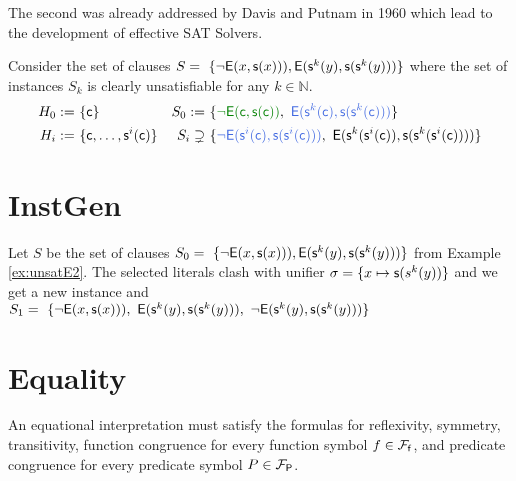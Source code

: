 The second was already addressed by Davis and Putnam in 1960
which lead to the development of effective SAT Solvers.

\begin{example}\label{ex:unsatE2}
	Consider the set of clauses 
	$S =\
	\{
	{ \lnot{\mathsf{E}}(x, {\mathsf s}(x)))}, 
	{ {\mathsf{E}}({\mathsf s}^k(y), {\mathsf s}({\mathsf s}^k(y)))}
	\}$ 
	where the set of instances $S_k$ is clearly unsatisfiable for any $k\in\mathbb{N}$.
%	
\begin{align*}
H_{0} :=&\  \{ \mc \} 
&
S_{0} :=&\ \{ 
{\colHi\lnot\mE(\mc,\msucc(\mc))},\
{\colEm \mE(\ms^k(\mc), \ms(\ms^k(\mc)))}
\}
\\
H_{i} :=&\ \{ \mc, \ldots, \msucc^i(\mc) \} 
&
S_{i} \supsetneq&\
\{
{\colEm \lnot\mE(\msucc^i(\mc),\msucc(\msucc^i(\mc)))},\
{\mE(\ms^k(\msucc^i(\mc)), \ms(\ms^k(\msucc^i(\mc))))}
\}
\end{align*}
\end{example}

\section{InstGen}

\begin{example}\label{ex:unsat2}
Let $S$ be the set of clauses 
$S_0 =\
\{
{ \lnot{\mathsf{E}}(x, {\mathsf s}(x)))}, 
{ {\mathsf{E}}({\mathsf s}^k(y), {\mathsf s}({\mathsf s}^k(y)))}
\}$
 from Example \ref{ex:unsatE2}. 
 The selected literals clash with unifier 
 $\sigma = \{ x\mapsto {\mathsf s}(s^k(y)) \}$ and we get a new instance
and $S_1 =\
 \{
 { \lnot{\mathsf{E}}(x, {\mathsf s}(x)))},\  
 { {\mathsf{E}}({\mathsf s}^k(y), {\mathsf s}({\mathsf s}^k(y)))},\
 { \lnot{\mathsf{E}}({\mathsf s}^k(y), {\mathsf s}({\mathsf s}^k(y)))}
 \}$
\end{example}




\section{Equality}



	An equational interpretation must satisfy the formulas for reflexivity, symmetry, transitivity, 
	function congruence for every function symbol $f\in{{\mathcal F}_{\mathsf f}}$, 
	and predicate congruence for every predicate symbol $P\in{{\mathcal F}_{\mathsf P}}$.

%


